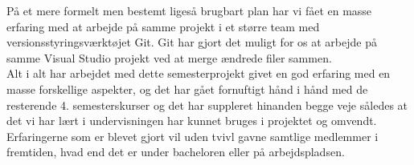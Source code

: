 På et mere formelt men bestemt ligeså brugbart plan har vi fået en masse erfaring med at arbejde på samme projekt i et større team med versionsstyringsværktøjet Git. Git har gjort det muligt for os at arbejde på samme Visual Studio projekt ved at merge ændrede filer sammen. \\

Alt i alt har arbejdet med dette semesterprojekt givet en god erfaring med en masse forskellige aspekter, og det har gået fornuftigt hånd i hånd med de resterende 4. semesterskurser og det har suppleret hinanden begge veje således at det vi har lært i undervisningen har kunnet bruges i projektet og omvendt. Erfaringerne som er blevet gjort vil uden tvivl gavne samtlige medlemmer i fremtiden, hvad end det er under bacheloren eller på arbejdspladsen.








